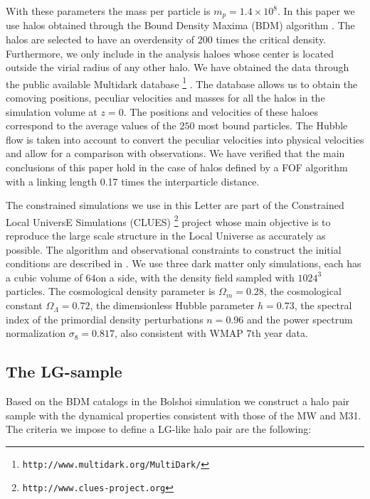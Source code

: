 \documentclass{emulateapj}
\newcommand{\hMpc}{{\ifmmode{h^{-1}{\rm Mpc}}\else{$h^{-1}$Mpc }\fi}}
\newcommand{\hMsun}{{\ifmmode{h^{-1}{\rm {M_{\odot}}}}\else{$h^{-1}{\rm{M_{\odot}}}$}\fi}}
\begin{document}
With these parameters the mass per particle is $m_{p}=1.4\times
10^{8}$\hMsun. In this paper we use halos obtained through the
Bound Density Maxima (BDM) algorithm \citep{KlypinBDM}. The halos are
selected to have an overdensity of 200 times the critical
density. Furthermore, we only include in the analysis haloes whose
center is located outside the virial radius of any other halo.  We
have obtained the data through the public available Multidark
database \footnote{{\tt http://www.multidark.org/MultiDark/}}
\citep{2011arXiv1109.0003R}. The database allows us to obtain the
comoving positions, peculiar velocities and masses for all the halos
in the simulation volume at $z=0$. The positions and velocities of
these haloes correspond to the average values of the $250$ most bound
particles. The Hubble flow is taken into account to convert the
peculiar velocities into physical velocities and allow for a
comparison with observations. We have verified that the main
conclusions of this paper hold in the case of halos defined by a FOF
algorithm with a linking length 0.17 times the interparticle
distance. 

The constrained simulations we use in this Letter are part of the
Constrained Local UniversE Simulations (CLUES)  \footnote{{\tt http://www.clues-project.org}} project whose main
objective is to reproduce the large scale structure in the Local
Universe as accurately as possible. The algorithm and observational
constraints to construct the initial conditions are  described in
\cite{clues2010}.  We use three dark matter only simulations, each
has a cubic volume of $64$\hMpc on a side, with the density field
sampled with $1024^3$ particles. The cosmological density parameter is
$\Omega_m=0.28$, the cosmological constant $\Omega_{\Lambda}=0.72$,
the dimensionless Hubble parameter $h=0.73$, the spectral index of the
primordial density perturbations $n=0.96$ and the power spectrum
normalization $\sigma_{8}=0.817$, also consistent with WMAP 7th year
data.  


\subsection{The LG-sample}
Based on the BDM catalogs in the Bolshoi simulation we construct a
halo pair sample with the dynamical  properties consistent with  those
of  the MW and M31. The  criteria  we impose to define a LG-like halo
pair are the following: 
\end{document}
